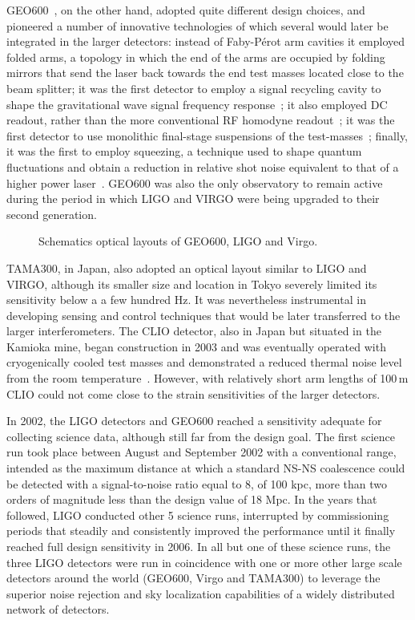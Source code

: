 GEO600~\cite{Grote_2010}, on the other hand, adopted quite different design choices, and pioneered a number of innovative technologies of which several would later be integrated in the larger detectors:
instead of Faby-P\'{e}rot arm cavities it employed folded arms, a topology in which the end of the arms are occupied by folding mirrors that send the laser back towards the end test masses located close to the beam splitter;
it was the first detector to employ a signal recycling cavity to shape the gravitational wave signal frequency response~\cite{Willke_2002};
it also employed DC readout, rather than the more conventional RF homodyne readout~\cite{DCreadout};
it was the first detector to use monolithic final-stage suspensions of the test-masses~\cite{Plissi_2000};
finally, it was the first to employ squeezing, a technique used to shape quantum fluctuations and obtain a reduction in relative shot noise equivalent to that of a higher power laser~\cite{Grote_2013}.
GEO600 was also the only observatory to remain active during the period in which LIGO and VIRGO were being upgraded to their second generation.
\begin{figure}[htb]
	\caption{\label{fig:opticallayouts}Schematics optical layouts of GEO600, LIGO and Virgo.}
\end{figure}


TAMA300\cite{Ando_2002}, in Japan, also adopted an optical layout similar to LIGO and VIRGO, although its smaller size and location in Tokyo severely limited its sensitivity below a a few hundred Hz.
It was nevertheless instrumental in developing sensing and control techniques that would be later transferred to the larger interferometers. 
The CLIO detector, also in Japan but situated in the Kamioka mine, began construction in 2003 and was eventually operated with cryogenically cooled test masses and demonstrated a reduced thermal noise level from the room temperature~\cite{Uchiyama_2012}. However, with relatively short arm lengths of 100\,m CLIO could not come close to the strain sensitivities of the larger detectors.

In 2002, the LIGO detectors and GEO600 reached a sensitivity adequate for collecting science data, although still far from the design goal.
The first science run took place between August and September 2002 with a conventional range, intended as the maximum distance at which a standard NS-NS coalescence could be detected with a signal-to-noise ratio equal to 8, of 100 kpc, more than two orders of magnitude less than the design value of 18 Mpc.
In the years that followed, LIGO conducted other 5 science runs, interrupted by commissioning periods that steadily and consistently improved the performance until it finally reached full design sensitivity in 2006.
In all but one of these science runs, the three LIGO detectors were run in coincidence with one or more other large scale detectors around the world (GEO600, Virgo and TAMA300) to leverage the superior noise rejection and sky localization capabilities of a widely distributed network of detectors\cite{Abbott_2004,Abbott_2005,Abbott_2006,Abbott_2008,Abadie_2010}.

